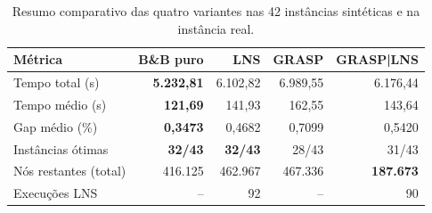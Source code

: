 \begin{table}[htbp]
\centering
\caption{Resumo comparativo das quatro variantes nas 42 instâncias sintéticas e na instância real.}
\label{tab:resumo_comparativo}
\small
\begin{tabular}{@{}lrrrr@{}}
\toprule
\textbf{Métrica} & \textbf{B\&B puro} & \textbf{LNS} & \textbf{GRASP} & \textbf{GRASP|LNS} \\
\midrule
Tempo total (s)        & \textbf{5.232,81} & 6.102,82 & 6.989,55 & 6.176,44 \\
Tempo médio (s)        & \textbf{121,69} & 141,93 & 162,55 & 143,64 \\
Gap médio (\%)         & \textbf{0,3473} & 0,4682 & 0,7099 & 0,5420 \\
Instâncias ótimas      & \textbf{32/43} & \textbf{32/43} & 28/43 & 31/43 \\
Nós restantes (total)  & 416.125 & 462.967 & 467.336 & \textbf{187.673} \\
Execuções LNS           & -- & 92 & -- & 90 \\
\bottomrule
\end{tabular}
\end{table}
